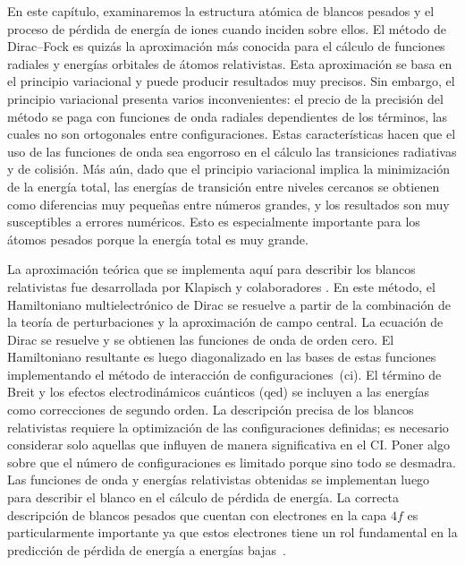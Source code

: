 En este capítulo, examinaremos la estructura atómica de blancos pesados
y el proceso de pérdida de energía de iones cuando inciden sobre ellos.
El método de Dirac--Fock es quizás la aproximación más conocida para el 
cálculo de funciones radiales y energías orbitales de átomos 
relativistas. Esta aproximación se basa en el principio variacional y 
puede producir resultados muy precisos. Sin embargo, el principio 
variacional presenta varios inconvenientes: el precio de la precisión 
del método se paga con funciones de onda radiales dependientes de los 
términos, las cuales no son ortogonales entre configuraciones. Estas 
características hacen que el uso de las funciones de onda sea engorroso 
en el cálculo las transiciones radiativas y de colisión. Más aún, dado 
que el principio variacional implica la minimización de la energía 
total, las energías de transición entre niveles cercanos se obtienen 
como diferencias muy pequeñas entre números grandes, y los resultados 
son muy susceptibles a errores numéricos. Esto es especialmente 
importante para los átomos pesados porque la energía total es muy 
grande. 

La aproximación teórica que se implementa aquí para describir los 
blancos relativistas fue desarrollada por Klapisch y colaboradores 
\cite{Klapisch:77,Koenig:72,Klapisch:71,Klapisch:67}. En este método, 
el Hamiltoniano multielectrónico de Dirac se resuelve a partir de la 
combinación de la teoría de perturbaciones y la aproximación de campo 
central. La ecuación de Dirac se resuelve y se obtienen las funciones 
de onda de orden cero. El Hamiltoniano resultante es luego diagonalizado 
en las bases de estas funciones implementando el método de interacción 
de configuraciones~(\acs{ci}). El término de Breit y los efectos 
electrodinámicos cuánticos (\acs{qed}) se incluyen a las energías como
correcciones de segundo orden. La descripción 
precisa de los blancos relativistas requiere la optimización de las 
configuraciones definidas; es necesario considerar solo aquellas que 
influyen de manera significativa en el CI. 
{\color{red} Poner algo sobre que el número de configuraciones es 
limitado porque sino todo se desmadra.} 
Las funciones de onda y energías relativistas obtenidas se implementan
luego para describir el blanco en el cálculo de pérdida de energía. La 
correcta descripción de blancos pesados que cuentan con electrones en la 
capa $4f$ es particularmente importante ya que estos electrones tiene un 
rol fundamental en la predicción de pérdida de energía a energías 
bajas~\cite{Roth:17}. 

